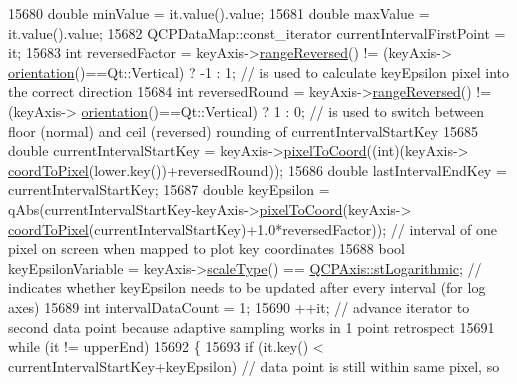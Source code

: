 \begin{DoxyCode}
15680       \textcolor{keywordtype}{double} minValue = it.value().value;
15681       \textcolor{keywordtype}{double} maxValue = it.value().value;
15682       QCPDataMap::const\_iterator currentIntervalFirstPoint = it;
15683       \textcolor{keywordtype}{int} reversedFactor = keyAxis->\hyperlink{class_q_c_p_axis_ade26dc7994ccd8a11f64fd83377ee021}{rangeReversed}() != (keyAxis->
      \hyperlink{class_q_c_p_axis_a57483f2f60145ddc9e63f3af53959265}{orientation}()==Qt::Vertical) ? -1 : 1; \textcolor{comment}{// is used to calculate keyEpsilon pixel into the correct
       direction}
15684       \textcolor{keywordtype}{int} reversedRound = keyAxis->\hyperlink{class_q_c_p_axis_ade26dc7994ccd8a11f64fd83377ee021}{rangeReversed}() != (keyAxis->
      \hyperlink{class_q_c_p_axis_a57483f2f60145ddc9e63f3af53959265}{orientation}()==Qt::Vertical) ? 1 : 0; \textcolor{comment}{// is used to switch between floor (normal) and ceil
       (reversed) rounding of currentIntervalStartKey}
15685       \textcolor{keywordtype}{double} currentIntervalStartKey = keyAxis->\hyperlink{class_q_c_p_axis_ae9289ef7043b9d966af88eaa95b037d1}{pixelToCoord}((\textcolor{keywordtype}{int})(keyAxis->
      \hyperlink{class_q_c_p_axis_a985ae693b842fb0422b4390fe36d299a}{coordToPixel}(lower.key())+reversedRound));
15686       \textcolor{keywordtype}{double} lastIntervalEndKey = currentIntervalStartKey;
15687       \textcolor{keywordtype}{double} keyEpsilon = qAbs(currentIntervalStartKey-keyAxis->\hyperlink{class_q_c_p_axis_ae9289ef7043b9d966af88eaa95b037d1}{pixelToCoord}(keyAxis->
      \hyperlink{class_q_c_p_axis_a985ae693b842fb0422b4390fe36d299a}{coordToPixel}(currentIntervalStartKey)+1.0*reversedFactor)); \textcolor{comment}{// interval of one pixel on screen
       when mapped to plot key coordinates}
15688       \textcolor{keywordtype}{bool} keyEpsilonVariable = keyAxis->\hyperlink{class_q_c_p_axis_a8563e13407bc0616da7f7c84e02de170}{scaleType}() == 
      \hyperlink{class_q_c_p_axis_a36d8e8658dbaa179bf2aeb973db2d6f0abf5b785ad976618816dc6f79b73216d4}{QCPAxis::stLogarithmic}; \textcolor{comment}{// indicates whether keyEpsilon needs to be updated after
       every interval (for log axes)}
15689       \textcolor{keywordtype}{int} intervalDataCount = 1;
15690       ++it; \textcolor{comment}{// advance iterator to second data point because adaptive sampling works in 1 point retrospect}
15691       \textcolor{keywordflow}{while} (it != upperEnd)
15692       \{
15693         \textcolor{keywordflow}{if} (it.key() < currentIntervalStartKey+keyEpsilon) \textcolor{comment}{// data point is still within same pixel, so
}
\end{DoxyCode}

